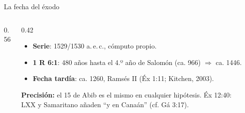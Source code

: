 \documentclass[hyperref={bookmarks=false},aspectratio=169]{beamer}
\newcommand{\destacar}[1]{\textbf{\textcolor{tierraroja}{#1}}}
\newcommand{\precision}[1]{{\footnotesize\color{sepia}\textbf{Precisión:} #1}}
\begin{document}
\begin{frame}{La fecha del éxodo}
\begin{columns}[c,onlytextwidth]
\begin{column}{0.56\textwidth}
\centering
{}
\end{column}
\begin{column}{0.42\textwidth}\scriptsize
\begin{itemize}
\item \destacar{Serie}: 1529/1530 a.\,e.\,c., cómputo propio.
\item \destacar{1 R 6:1}: 480 años hasta el 4.º año de Salomón (ca. 966) $\Rightarrow$ ca. 1446.
\item \destacar{Fecha tardía}: ca. 1260, Ramsés II (Éx 1:11; Kitchen, 2003).
\end{itemize}
\precision{el 15 de Abib es el mismo en cualquier hipótesis. Éx 12:40: LXX y Samaritano añaden ``y en Canaán'' (cf. Gá 3:17).}
\end{column}
\end{columns}
\end{frame}
\end{document}

